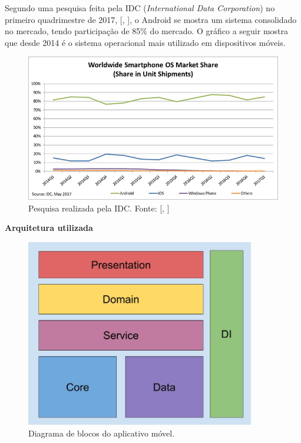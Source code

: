 \documentclass[
	12pt,				%
	oneside,			%
	a4paper,			%
	brazil				%
]{abntex2}
\newcommand{\citecustom}[1]{[\citeauthoronline{#1}, \citeyear{#1}]}
\begin{document}
{Segundo uma pesquisa feita pela IDC (\textit{International Data Corporation}) no primeiro quadrimestre de 2017, \citecustom{idc}, o Android se mostra um sistema consolidado no mercado, tendo participação de 85\% do mercado. O gráfico a seguir mostra que desde 2014 é o sistema operacional mais utilizado em dispositivos móveis.

\begin{figure}[H]
\centering
\includegraphics[width=15cm, center]{images/smartphone-share-market.jpg}
\caption{Pesquisa realizada pela IDC. Fonte: \citecustom{idc}}
\label{Rotulo}
\end{figure}

\newpage

\textbf{Arquitetura utilizada}

\begin{figure}[H]
\centering
\includegraphics[width=10cm, center]{images/brick_diagram_beacon}
\caption{Diagrama de blocos do aplicativo móvel.}
\label{Rotulo}
\end{figure}

}
\end{document}
